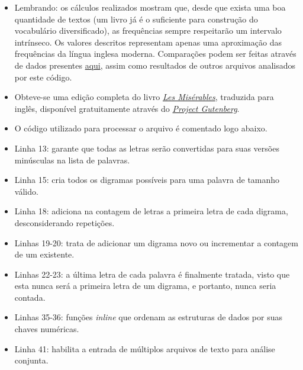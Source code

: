 \documentclass{article}
\begin{document}
\begin{itemize}

    \item Lembrando: os cálculos realizados mostram que, desde que exista uma
        boa quantidade de textos (um livro já é o suficiente para construção
        do vocabulário diversificado), as frequências sempre respeitarão um
        intervalo intrínseco. Os valores descritos representam apenas uma
        aproximação das frequências da língua inglesa moderna. Comparações
        podem ser feitas através de dados presentes
        \href{http://en.wikipedia.org/wiki/Letter_frequency#Relative_frequencies_of_letters_in_the_English_language}{aqui},
        assim como resultados de outros arquivos analisados por este código.

    \item Obteve-se uma edição completa do livro
        \textit{\href{http://www.gutenberg.org/cache/epub/135/pg135.txt}{Les Misérables}},
        traduzida para inglês, disponível gratuitamente através do
        \textit{\href{http://www.gutenberg.org}{Project Gutenberg}}.

    \item O código utilizado para processar o arquivo é comentado logo abaixo.

    

    \item Linha 13: garante que todas as letras serão convertidas para suas
        versões minúsculas na lista de palavras.

    \item Linha 15: cria todos os digramas possíveis para uma palavra de
        tamanho válido.

    \item Linha 18: adiciona na contagem de letras a primeira letra de cada
        digrama, desconsiderando repetições.

    \item Linhas 19-20: trata de adicionar um digrama novo ou incrementar a
        contagem de um existente.

    \item Linhas 22-23: a última letra de cada palavra é finalmente tratada,
        visto que esta nunca será a primeira letra de um digrama, e portanto,
        nunca seria contada.

    \item Linhas 35-36: funções \textit{inline} que ordenam as estruturas de
        dados por suas chaves numéricas.

    \item Linha 41: habilita a entrada de múltiplos arquivos de texto para
        análise conjunta.

\end{itemize}
\end{document}
